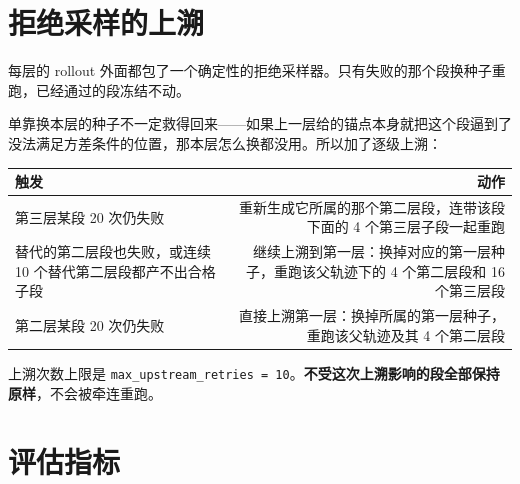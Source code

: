 \documentclass[11pt,a4paper]{ctexart}
\newcommand{\cf}[1]{\texttt{\small #1}}
\begin{document}
\section{拒绝采样的上溯}

每层的 rollout 外面都包了一个确定性的拒绝采样器。只有失败的那个段换种子重跑，已经通过的段冻结不动。

单靠换本层的种子不一定救得回来——如果上一层给的锚点本身就把这个段逼到了没法满足方差条件的位置，那本层怎么换都没用。所以加了逐级上溯：

\begin{center}
\small
\begin{tabularx}{\textwidth}{@{}p{3.4cm}R@{}}
\toprule
\textbf{触发} & \textbf{动作} \\
\midrule
第三层某段 20 次仍失败 & 重新生成它所属的那个第二层段，连带该段下面的 4 个第三层子段一起重跑 \\
\addlinespace
替代的第二层段也失败，\newline 或连续 10 个替代第二层段都产不出合格子段 & 继续上溯到第一层：换掉对应的第一层种子，重跑该父轨迹下的 4 个第二层段和 16 个第三层段 \\
\addlinespace
第二层某段 20 次仍失败 & 直接上溯第一层：换掉所属的第一层种子，重跑该父轨迹及其 4 个第二层段 \\
\bottomrule
\end{tabularx}
\end{center}

\noindent 上溯次数上限是 \cf{max\_upstream\_retries = 10}。\textbf{不受这次上溯影响的段全部保持原样}，不会被牵连重跑。

\section{评估指标}
\end{document}
